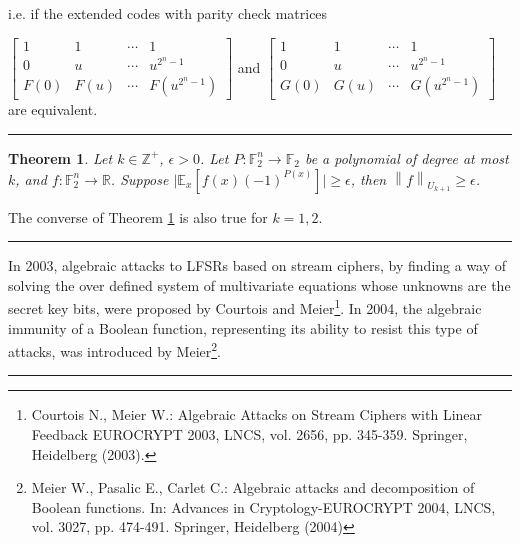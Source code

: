 \documentclass[8pt,oneside]{article}
\newcommand{\0}{\textbf{0}}
\newcommand{\1}{\textbf{1}}
\newcommand{\Z}{\mathbb{Z}}
\newcommand{\F}{\mathbb{F}}
\newcommand{\R}{\mathbb{R}}
\newtheorem{theorem}{Theorem}
\begin{document}
    i.e. if the extended codes with parity check matrices

    $ \begin{bmatrix}
        1 & 1 &\cdots &1\\
        0& u& \cdots &u^{2^n-1}\\
        F(0)& F(u)& \cdots &F(u^{2^n-1})
    \end{bmatrix} $ 
    and 
    $\begin{bmatrix}
        1 & 1 &\cdots &1\\
        0& u& \cdots &u^{2^n-1}\\
        G(0)& G(u)& \cdots &G(u^{2^n-1})
    \end{bmatrix}$
    are equivalent.


    \noindent\rule{\linewidth}{0.4pt}

    \begin{theorem}\label{gowers}
        Let $ k\in\Z^+ $, $ \epsilon>0 $. Let $ P:\F_2^n\rightarrow\F_2 $ be a polynomial of degree
        at most $ k $, and $ f:\F_2^n\rightarrow\R $. Suppose $ \lvert \mathbb{E}_x\left[f(x)(-1)^{P(x)}\right]\rvert\geq\epsilon  $, then $ \left\lVert f\right\rVert _{U_{k+1}}\geq\epsilon $.
    \end{theorem}
    The converse of Theorem \ref{gowers} is also true for $k = 1, 2$.



    
    \noindent\rule{\linewidth}{0.4pt}

    In 2003, algebraic attacks to LFSRs based on stream ciphers, by finding a way of solving 
    the over defined system of multivariate equations whose unknowns are the secret key bits,
    were proposed by Courtois and Meier\footnote{Courtois N., Meier W.: Algebraic Attacks on Stream Ciphers with Linear Feedback EUROCRYPT 2003,
    LNCS, vol. 2656, pp. 345-359. Springer, Heidelberg (2003).}. In 2004, the algebraic immunity of a Boolean
    function, representing its ability to resist this type of attacks, was introduced by Meier\footnote{Meier W., Pasalic E., Carlet C.: Algebraic attacks and decomposition of Boolean functions. In: Advances
    in Cryptology-EUROCRYPT 2004, LNCS, vol. 3027, pp. 474-491. Springer, Heidelberg (2004)}.

    \noindent\rule{\linewidth}{0.4pt}
\end{document}
